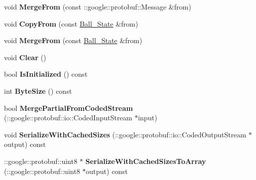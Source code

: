 \begin{DoxyCompactItemize}
\item 
void {\bfseries Merge\+From} (const \+::google\+::protobuf\+::\+Message \&from)\hypertarget{classvss__state_1_1Ball__State_a23b0aa5fb0ead3fa0eb1d49f044a4108}{}\label{classvss__state_1_1Ball__State_a23b0aa5fb0ead3fa0eb1d49f044a4108}

\item 
void {\bfseries Copy\+From} (const \hyperlink{classvss__state_1_1Ball__State}{Ball\+\_\+\+State} \&from)\hypertarget{classvss__state_1_1Ball__State_abc6d9bde7cd19d33f5592fe7e89958f2}{}\label{classvss__state_1_1Ball__State_abc6d9bde7cd19d33f5592fe7e89958f2}

\item 
void {\bfseries Merge\+From} (const \hyperlink{classvss__state_1_1Ball__State}{Ball\+\_\+\+State} \&from)\hypertarget{classvss__state_1_1Ball__State_a6c0a4da68998dea51ba4971d3f3ae758}{}\label{classvss__state_1_1Ball__State_a6c0a4da68998dea51ba4971d3f3ae758}

\item 
void {\bfseries Clear} ()\hypertarget{classvss__state_1_1Ball__State_a23083679f69714534dff6d2fa4dfd69c}{}\label{classvss__state_1_1Ball__State_a23083679f69714534dff6d2fa4dfd69c}

\item 
bool {\bfseries Is\+Initialized} () const \hypertarget{classvss__state_1_1Ball__State_a86118bd22017a79d8bcecbb9759664ae}{}\label{classvss__state_1_1Ball__State_a86118bd22017a79d8bcecbb9759664ae}

\item 
int {\bfseries Byte\+Size} () const \hypertarget{classvss__state_1_1Ball__State_a37464e62ecce865fa9b7d71df18a6df2}{}\label{classvss__state_1_1Ball__State_a37464e62ecce865fa9b7d71df18a6df2}

\item 
bool {\bfseries Merge\+Partial\+From\+Coded\+Stream} (\+::google\+::protobuf\+::io\+::\+Coded\+Input\+Stream $\ast$input)\hypertarget{classvss__state_1_1Ball__State_a23384562e9b1779b7eae6df07fec8c08}{}\label{classvss__state_1_1Ball__State_a23384562e9b1779b7eae6df07fec8c08}

\item 
void {\bfseries Serialize\+With\+Cached\+Sizes} (\+::google\+::protobuf\+::io\+::\+Coded\+Output\+Stream $\ast$output) const \hypertarget{classvss__state_1_1Ball__State_ac9561ed1c347cc216c9adda156c8b1a7}{}\label{classvss__state_1_1Ball__State_ac9561ed1c347cc216c9adda156c8b1a7}

\item 
\+::google\+::protobuf\+::uint8 $\ast$ {\bfseries Serialize\+With\+Cached\+Sizes\+To\+Array} (\+::google\+::protobuf\+::uint8 $\ast$output) const \hypertarget{classvss__state_1_1Ball__State_a2db6bbee44c417e395cc2b707bbab23c}{}\label{classvss__state_1_1Ball__State_a2db6bbee44c417e395cc2b707bbab23c}


\end{DoxyCompactItemize}
